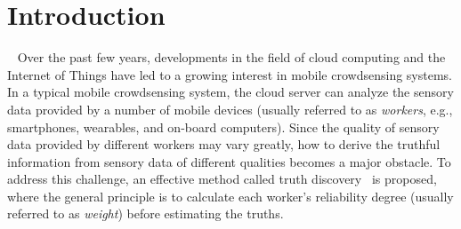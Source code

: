 \documentclass[conference]{IEEEtran}
\begin{document}
\section{Introduction}~\label{sec1}
Over the past few years, developments in the field of cloud computing and the Internet of Things have led to a growing interest in mobile crowdsensing systems.
In a typical mobile crowdsensing system, the cloud server can analyze the sensory data provided by a number of mobile devices (usually referred to as {\em workers}, e.g., smartphones, wearables, and on-board computers).
Since the quality of sensory data provided by different workers may vary greatly, how to derive the truthful information from sensory data of different qualities becomes a major obstacle.
To address this challenge, an effective method called truth discovery~\cite{li_resolving_2014,li_confidence-aware_2014} is proposed, where the general principle is to calculate each worker's reliability degree (usually referred to as {\em weight}) before estimating the truths.
\end{document}
